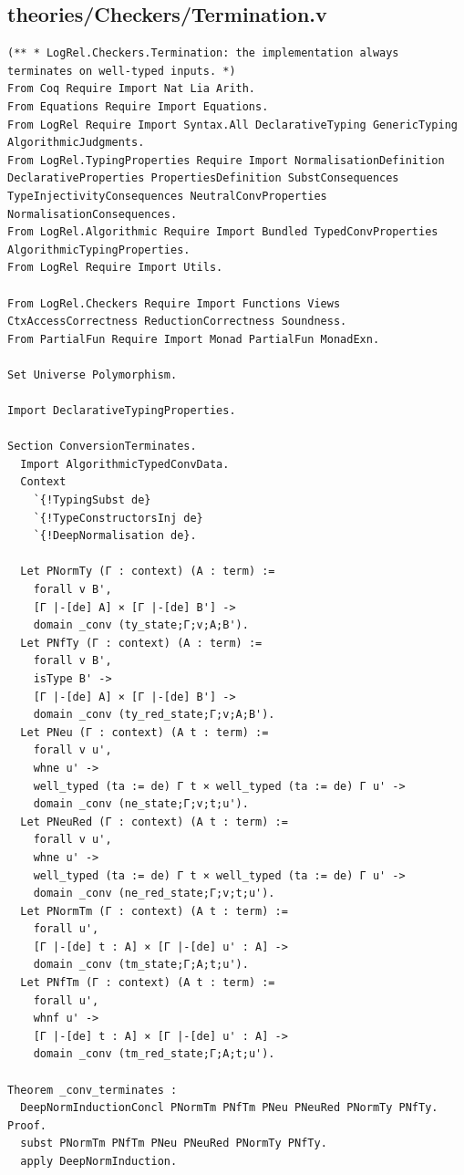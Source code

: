 \documentclass[10pt,a4paper]{amsart}
\begin{document}
\subsection*{theories/Checkers/Termination.v}
\begin{lstlisting}
(** * LogRel.Checkers.Termination: the implementation always terminates on well-typed inputs. *)
From Coq Require Import Nat Lia Arith.
From Equations Require Import Equations.
From LogRel Require Import Syntax.All DeclarativeTyping GenericTyping AlgorithmicJudgments.
From LogRel.TypingProperties Require Import NormalisationDefinition DeclarativeProperties PropertiesDefinition SubstConsequences TypeInjectivityConsequences NeutralConvProperties NormalisationConsequences.
From LogRel.Algorithmic Require Import Bundled TypedConvProperties AlgorithmicTypingProperties.
From LogRel Require Import Utils.

From LogRel.Checkers Require Import Functions Views CtxAccessCorrectness ReductionCorrectness Soundness.
From PartialFun Require Import Monad PartialFun MonadExn.

Set Universe Polymorphism.

Import DeclarativeTypingProperties.

Section ConversionTerminates.
  Import AlgorithmicTypedConvData.
  Context
    `{!TypingSubst de}
    `{!TypeConstructorsInj de}
    `{!DeepNormalisation de}.

  Let PNormTy (Γ : context) (A : term) :=
    forall v B',
    [Γ |-[de] A] × [Γ |-[de] B'] ->
    domain _conv (ty_state;Γ;v;A;B').
  Let PNfTy (Γ : context) (A : term) :=
    forall v B',
    isType B' ->
    [Γ |-[de] A] × [Γ |-[de] B'] ->
    domain _conv (ty_red_state;Γ;v;A;B').
  Let PNeu (Γ : context) (A t : term) :=
    forall v u',
    whne u' ->
    well_typed (ta := de) Γ t × well_typed (ta := de) Γ u' ->
    domain _conv (ne_state;Γ;v;t;u').
  Let PNeuRed (Γ : context) (A t : term) :=
    forall v u',
    whne u' ->
    well_typed (ta := de) Γ t × well_typed (ta := de) Γ u' ->
    domain _conv (ne_red_state;Γ;v;t;u').
  Let PNormTm (Γ : context) (A t : term) :=
    forall u',
    [Γ |-[de] t : A] × [Γ |-[de] u' : A] ->
    domain _conv (tm_state;Γ;A;t;u').
  Let PNfTm (Γ : context) (A t : term) :=
    forall u',
    whnf u' ->
    [Γ |-[de] t : A] × [Γ |-[de] u' : A] ->
    domain _conv (tm_red_state;Γ;A;t;u').

Theorem _conv_terminates :
  DeepNormInductionConcl PNormTm PNfTm PNeu PNeuRed PNormTy PNfTy.
Proof.
  subst PNormTm PNfTm PNeu PNeuRed PNormTy PNfTy.
  apply DeepNormInduction.


\end{lstlisting}
\end{document}
